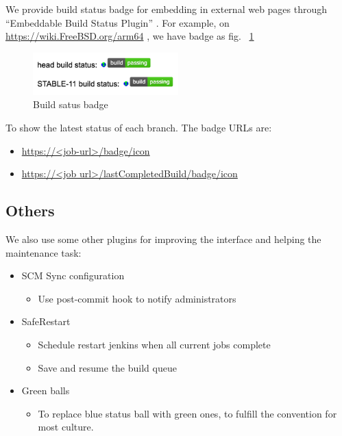 \documentclass[a4paper,twocolumn,10pt]{article}
\begin{document}
We provide build status badge for embedding in external web pages through
``Embeddable Build Status Plugin''
\cite{jenkins-embeddable-build-status-plugin}. For example, on
\url{https://wiki.FreeBSD.org/arm64} , we have badge as fig.
~\ref{build-status-badge}

\begin{figure}
\centering
\includegraphics[width=0.5\textwidth]{build-status-badge.png}
\caption{Build satus badge}
\label{build-status-badge}
\end{figure}

To show the latest status of each branch. The badge URLs are:
\begin{itemize}
\item \url{https://<job-url>/badge/icon}
\item \url{https://<job url>/lastCompletedBuild/badge/icon}
\end{itemize}

\subsection{Others}

We also use some other plugins for improving the interface and helping the
maintenance task:

\begin{itemize}
\item SCM Sync configuration \cite{jenkins-scm-sync-configuration-plugin}
  \begin{itemize}
  \item Use post-commit hook to notify administrators
  \end{itemize}
\item SafeRestart \cite{jenkins-saferestart-plugin}
  \begin{itemize}
  \item Schedule restart jenkins when all current jobs complete
  \item Save and resume the build queue
  \end{itemize}
\item Green balls \cite{jenkins-green-balls-plugin}
  \begin{itemize}
  \item To replace blue status ball with green ones, to fulfill the convention
        for most culture.
  \end{itemize}
\end{itemize}
\end{document}
